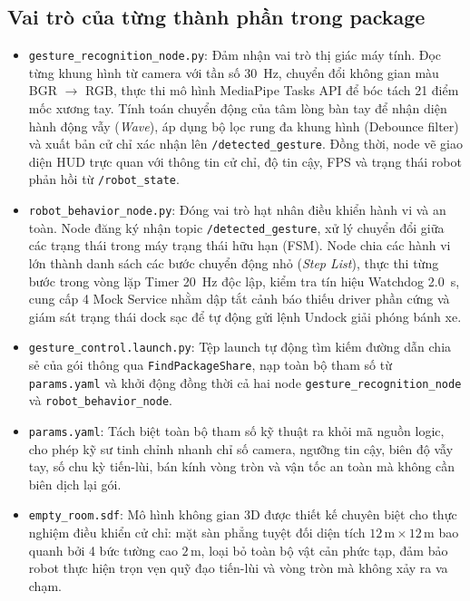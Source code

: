 \subsection{Vai trò của từng thành phần trong package}
\begin{itemize}
    \item \texttt{gesture\_recognition\_node.py}: Đảm nhận vai trò thị giác máy tính. Đọc từng khung hình từ camera với tần số \SI{30}{\hertz}, chuyển đổi không gian màu BGR $\to$ RGB, thực thi mô hình MediaPipe Tasks API để bóc tách 21 điểm mốc xương tay. Tính toán chuyển động của tâm lòng bàn tay để nhận diện hành động vẫy (\textit{Wave}), áp dụng bộ lọc rung đa khung hình (Debounce filter) và xuất bản cử chỉ xác nhận lên \texttt{/detected\_gesture}. Đồng thời, node vẽ giao diện HUD trực quan với thông tin cử chỉ, độ tin cậy, FPS và trạng thái robot phản hồi từ \texttt{/robot\_state}.
    \item \texttt{robot\_behavior\_node.py}: Đóng vai trò hạt nhân điều khiển hành vi và an toàn. Node đăng ký nhận topic \texttt{/detected\_gesture}, xử lý chuyển đổi giữa các trạng thái trong máy trạng thái hữu hạn (FSM). Node chia các hành vi lớn thành danh sách các bước chuyển động nhỏ (\textit{Step List}), thực thi từng bước trong vòng lặp Timer \SI{20}{\hertz} độc lập, kiểm tra tín hiệu Watchdog \SI{2.0}{\second}, cung cấp 4 Mock Service nhằm dập tắt cảnh báo thiếu driver phần cứng và giám sát trạng thái dock sạc để tự động gửi lệnh Undock giải phóng bánh xe.
    \item \texttt{gesture\_control.launch.py}: Tệp launch tự động tìm kiếm đường dẫn chia sẻ của gói thông qua \texttt{FindPackageShare}, nạp toàn bộ tham số từ \texttt{params.yaml} và khởi động đồng thời cả hai node \texttt{gesture\_recognition\_node} và \texttt{robot\_behavior\_node}.
    \item \texttt{params.yaml}: Tách biệt toàn bộ tham số kỹ thuật ra khỏi mã nguồn logic, cho phép kỹ sư tinh chỉnh nhanh chỉ số camera, ngưỡng tin cậy, biên độ vẫy tay, số chu kỳ tiến-lùi, bán kính vòng tròn và vận tốc an toàn mà không cần biên dịch lại gói.
    \item \texttt{empty\_room.sdf}: Mô hình không gian 3D được thiết kế chuyên biệt cho thực nghiệm điều khiển cử chỉ: mặt sàn phẳng tuyệt đối diện tích $12\,\text{m} \times 12\,\text{m}$ bao quanh bởi 4 bức tường cao $2\,\text{m}$, loại bỏ toàn bộ vật cản phức tạp, đảm bảo robot thực hiện trọn vẹn quỹ đạo tiến-lùi và vòng tròn mà không xảy ra va chạm.
\end{itemize}

